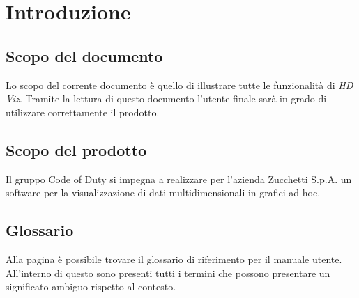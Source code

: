 \section{Introduzione}


\subsection{Scopo del documento}
Lo scopo del corrente documento è quello di illustrare tutte le funzionalità di 
\textit{HD Viz}. Tramite la lettura di questo documento l'utente finale sarà in grado
di utilizzare correttamente il prodotto.


\subsection{Scopo del prodotto}
Il gruppo Code of Duty si impegna a realizzare per l'azienda Zucchetti S.p.A. un 
software per la visualizzazione di dati multidimensionali in grafici ad-hoc.



\subsection{Glossario}
Alla pagina %
è possibile trovare il glossario di riferimento per il manuale utente. All'interno di questo
sono presenti tutti i termini che possono presentare un significato ambiguo rispetto 
al contesto.
